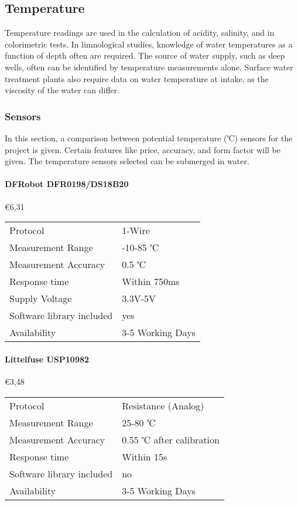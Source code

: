 \subsection{Temperature}
Temperature readings are used in the calculation of acidity, salinity, and in colorimetric tests. In limnological studies, knowledge of water temperatures as a function of depth often are required. The source of water supply, such as deep wells, often can be identified by temperature measurements alone. Surface water treatment plants also require data on water temperature at intake, as the viscosity of the water can differ. \cite{standardmethods}

\subsubsection{Sensors}
In this section, a comparison between potential temperature (℃) sensors for the project is given. Certain features like price, accuracy, and form factor will be given. The temperature sensors selected can be submerged in water.

\paragraph{DFRobot DFR0198/DS18B20}\mbox{€6,31} \cite{DFR0198}
\begin{table}[h!]
	\centering
	\quad
	\begin{tabular}{| l | l |}
    \hline
    Protocol & 1-Wire\\
    Measurement Range & -10-85 ℃ \\
    Measurement Accuracy &  0.5 ℃ \\
    Response time & Within 750ms \\
    Supply Voltage & 3.3V-5V \\
    Software library included & yes \\
    Availability & 3-5 Working Days \\
    \hline
	\end{tabular}
\end{table}

\paragraph{Littelfuse USP10982}\mbox{€3,48} \cite{USP10982}
\begin{table}[h!]
	\centering
	\quad
	\begin{tabular}{| l | l |}
    \hline
    Protocol & Resistance (Analog)\\
    Measurement Range & 25-80 ℃ \\
    Measurement Accuracy &  0.55 ℃ after calibration\\
    Response time & Within 15s \\
    Software library included & no \\
    Availability & 3-5 Working Days \\
    \hline
	\end{tabular}
\end{table}